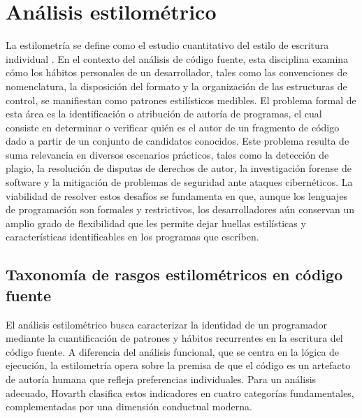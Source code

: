 \section{Análisis estilométrico}

La estilometría se define como el estudio cuantitativo del estilo de escritura individual \cite{Horvath2026ProgrammerAttribution}. En el contexto del análisis de código fuente, esta disciplina examina cómo los hábitos personales de un desarrollador, tales como las convenciones de nomenclatura, la disposición del formato y la organización de las estructuras de control, se manifiestan como patrones estilísticos medibles\cite{Horvath2026ProgrammerAttribution}. El problema formal de esta área es la identificación o atribución de autoría de programas, el cual consiste en determinar o verificar quién es el autor de un fragmento de código dado a partir de un conjunto de candidatos conocidos\cite{Horvath2026ProgrammerAttribution}. Este problema resulta de suma relevancia en diversos escenarios prácticos, tales como la detección de plagio, la resolución de disputas de derechos de autor, la investigación forense de software y la mitigación de problemas de seguridad ante ataques cibernéticos. La viabilidad de resolver estos desafíos se fundamenta en que, aunque los lenguajes de programación son formales y restrictivos, los desarrolladores aún conservan un amplio grado de flexibilidad que les permite dejar huellas estilísticas y características identificables en los programas que escriben\cite{Horvath2026ProgrammerAttribution}.


\subsection{Taxonomía de rasgos estilométricos en código fuente}

El análisis estilométrico busca caracterizar la identidad de un programador mediante la cuantificación de patrones y hábitos recurrentes en la escritura del código fuente. A diferencia del análisis funcional, que se centra en la lógica de ejecución, la estilometría opera sobre la premisa de que el código es un artefacto de autoría humana que refleja preferencias individuales. Para un análisis adecuado, Hovarth \cite{Horvath2026ProgrammerAttribution} clasifica estos indicadores en cuatro categorías fundamentales, complementadas por una dimensión conductual moderna.

